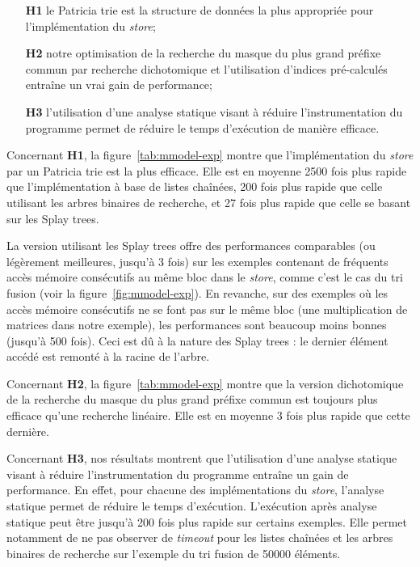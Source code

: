 \begin{itemize}
\item[\textbf{H1}]
  le Patricia trie est la structure de données la plus appropriée pour
  l'implémentation du {\em store};

\item[\textbf{H2}]
  notre optimisation de la recherche du masque du plus grand préfixe commun par
  recherche dichotomique et l'utilisation d'indices pré-calculés entraîne un
  vrai gain de performance;

\item[\textbf{H3}]
  l'utilisation d'une analyse statique visant à réduire l'instrumentation
  du programme permet de réduire le temps d'exécution de manière efficace.
\end{itemize}


Concernant \textbf{H1}, la figure~\ref{tab:mmodel-exp} montre que
l'implémentation du {\em store} par un Patricia trie est la plus efficace.
Elle est en moyenne 2500 fois plus rapide que l'implémentation à base de listes
chaînées, 200 fois plus rapide que celle utilisant les arbres binaires de
recherche, et 27 fois plus rapide que celle se basant sur les Splay trees.

La version utilisant les Splay trees offre des performances comparables (ou
légèrement meilleures, jusqu'à 3 fois) sur les exemples contenant de fréquents
accès mémoire consécutifs au même bloc dans le {\em store}, comme c'est le cas
du tri fusion (voir la figure~\ref{fig:mmodel-exp}).
En revanche, sur des exemples où les accès mémoire consécutifs ne se font pas
sur le même bloc (une multiplication de matrices dans notre exemple), les
performances sont beaucoup moins bonnes (jusqu'à 500 fois).
Ceci est dû à la nature des Splay trees : le dernier élément accédé est remonté
à la racine de l'arbre.

Concernant \textbf{H2}, la figure~\ref{tab:mmodel-exp} montre que la version
dichotomique de la recherche du masque du plus grand préfixe commun est toujours
plus efficace qu'une recherche linéaire.
Elle est en moyenne 3 fois plus rapide que cette dernière.

Concernant \textbf{H3}, nos résultats montrent que l'utilisation d'une analyse
statique visant à réduire l'instrumentation du programme entraîne un gain de
performance.
En effet, pour chacune des implémentations du {\em store}, l'analyse statique
permet de réduire le temps d'exécution.
L'exécution après analyse statique peut être jusqu'à 200 fois plus rapide sur
certains exemples.
Elle permet notamment de ne pas observer de {\em timeout} pour les listes
chaînées et les arbres binaires de recherche sur l'exemple du tri fusion de
50000 éléments.


